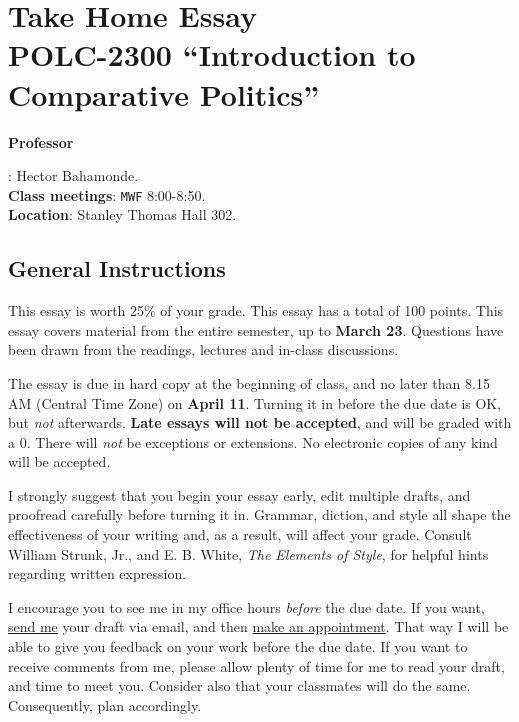 \documentclass{article}
\begin{document}
\setlength{\parindent}{0em}
\setlength{\parskip}{0.5em}
 
{\centering\section*{{\bf Take Home Essay}\\{\bf POLC-2300 ``Introduction to Comparative Politics''}}}


{\vspace{.5cm}\raggedright \bf Professor}: Hector Bahamonde.\\
{\bf Class meetings}: \texttt{MWF} 8:00-8:50.\\
{\bf Location}: Stanley Thomas Hall 302.


\subsection*{General Instructions}

This essay is worth 25\% of your grade. This essay has a total of 100 points. This essay covers material from the entire semester, up to {\bf  March 23}. Questions have been drawn from the readings, lectures and in-class discussions. 

{\color{blue}The essay is due in hard copy at the beginning of class, and no later than 8.15 AM (Central Time Zone) on {\bf April 11}}. Turning it in before the due date is OK, but \emph{not} afterwards. {\bf Late essays will not be accepted}, and will be graded with a $0$. There will \emph{not} be exceptions or extensions. No electronic copies of any kind will be accepted.

I strongly suggest that you begin your essay early, edit multiple drafts, and proofread carefully before turning it in. Grammar, diction, and style all shape the effectiveness of your writing and, as a result, will affect your grade. Consult William Strunk, Jr., and E. B. White, \emph{The Elements of Style}, for helpful hints regarding written expression. 

I encourage you to see me in my office hours \emph{before} the due date. If you want, \href{mailto:\filetext}{send me} your draft via email, and then \href{https://calendly.com/bahamonde/officehours}{make an appointment}. That way I will be able to give you feedback on your work before the due date. If you want to receive comments from me, please allow plenty of time for me to read your draft, and time to meet you. Consider also that your classmates will do the same. Consequently, plan accordingly.
\end{document}
